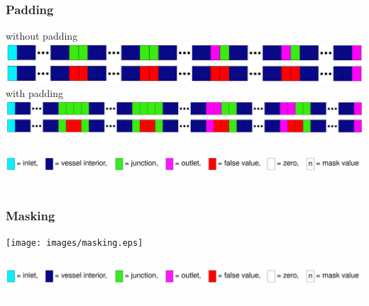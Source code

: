 \documentclass{beamer}
\begin{document}
\begin{frame}
	\frametitle{Padding}
	without padding
	\includegraphics[width=\textwidth]{images/padding1.eps}
	with padding
	\includegraphics[width=\textwidth]{images/padding2.eps}
	\includegraphics[width=\textwidth]{images/legend.eps}
\end{frame}
\begin{frame}
	\frametitle{Masking}
	\texttt{[image: images/masking.eps]}
	\includegraphics[width=\textwidth]{images/legend.eps}
\end{frame}
\end{document}
